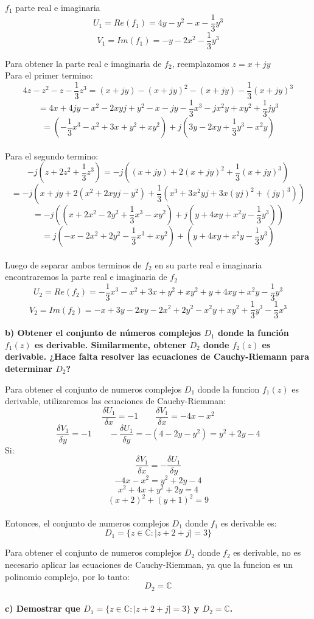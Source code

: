 \documentclass[12pt,a4paper]{report}
\begin{document}
$f_1$ parte real e imaginaria
$$U_1=Re(f_1)=4y-y^2-x-\frac{1}{3}y^3$$
$$V_1=Im(f_1)=-y-2x^2-\frac{1}{3}y^3$$

Para obtener la parte real e imaginaria de $f_2$, reemplazamos $z=x+jy$\\
Para el primer termino:
$$4z - z^2 - z - \frac{1}{3}z^3=(x+jy) - (x+jy)^2 - (x+jy) - \frac{1}{3}(x+jy)^3$$
$$=4x + 4jy -x^2 -2xyj + y^2 -x -jy - \frac{1}{3}x^3 - jx^2y + xy^2 + \frac{1}{3}jy^3$$
$$=(- \frac{1}{3}x^3 -x^2 + 3x + y^2 + xy^2) +j(3y -2xy + \frac{1}{3}y^3 - x^2y )$$ \\
Para el segundo termino:
$$-j (z + 2z^2 + \frac{1}{3}z^3) = -j ((x+jy) + 2(x+jy)^2 + \frac{1}{3}(x+jy)^3)$$
$$=-j (x+jy + 2(x^2+2xyj-y^2) + \frac{1}{3}(x^3 + 3x^2yj + 3x(yj)^2 + (jy)^3))$$
$$=-j ((x + 2x^2 - 2y^2 + \frac{1}{3} x^3 - xy^2) + j( y +4xy + x^2y - \frac{1}{3}y^3))$$
$$=j(-x - 2x^2 + 2y^2 - \frac{1}{3} x^3 + xy^2) + ( y +4xy + x^2y - \frac{1}{3}y^3)$$\\
Luego de separar ambos terminos de $f_2$ en su parte real e imaginaria encontraremos la parte real
e imaginaria de $f_2$
$$U_2=Re(f_2)=- \frac{1}{3}x^3 - x^2 + 3x + y^2 + xy^2 + y +4xy + x^2y - \frac{1}{3}y^3$$
$$V_2=Im(f_2)=-x + 3y -2xy - 2x^2 + 2y^2 - x^2y + xy^2 + \frac{1}{3}y^3 - \frac{1}{3} x^3$$

\textbf{b) Obtener el conjunto de números complejos $D_1$ donde la función $f_1(z)$ es derivable. Similarmente, obtener $D_2$ donde $f_2(z)$ es derivable.
¿Hace falta resolver las ecuaciones de Cauchy-Riemann para determinar $D_2$?}

Para obtener el conjunto de numeros complejos $D_1$ donde la funcion $f_1(z)$ es derivable, utilizaremos las ecuaciones de Cauchy-Riemman:
$$\frac{\delta U_1}{\delta x}=-1 \quad \quad \frac{\delta V_1}{\delta x}=-4x-x^2$$
$$\frac{\delta V_1}{\delta y}=-1 \quad \quad - \frac{\delta U_1}{\delta y}=-(4-2y-y^2)=y^2+2y-4$$
Si:$$\frac{\delta V_1}{\delta x}=-\frac{\delta U_1}{\delta y}$$
$$-4x-x^2=y^2+2y-4$$
$$x^2+4x+y^2+2y=4$$
$$(x+2)^2+(y+1)^2=9$$\\
Entonces, el conjunto de numeros complejos $D_1$ donde $f_1$ es derivable es:
$$D_1 = \{z \in \mathbb{C} : |z + 2 + j| = 3\}$$

Para obtener el conjunto de numeros complejos $D_2$ donde $f_2$ es derivable, no es necesario aplicar las ecuaciones de Cauchy-Riemman,
ya que la funcion es un polinomio complejo, por lo tanto:
$$D_2=\mathbb{C}$$\\

\textbf{c) Demostrar que $D_1 = \{z \in \mathbb{C} : |z + 2 + j| = 3\}$ y $D_2 = \mathbb{C}$.}
\end{document}

